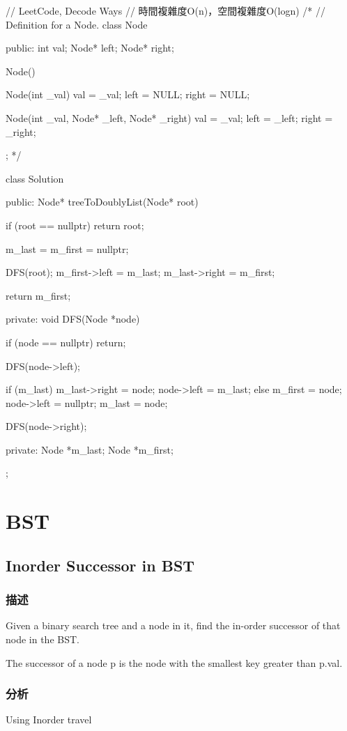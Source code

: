 \begin{Code}
// LeetCode, Decode Ways
// 時間複雜度O(n)，空間複雜度O(logn)
/*
// Definition for a Node.
class Node {
public:
    int val;
    Node* left;
    Node* right;

    Node() {}

    Node(int _val) {
        val = _val;
        left = NULL;
        right = NULL;
    }

    Node(int _val, Node* _left, Node* _right) {
        val = _val;
        left = _left;
        right = _right;
    }
};
*/

class Solution {
public:
    Node* treeToDoublyList(Node* root) {
        if (root == nullptr) return root;

        m_last = m_first = nullptr;

        DFS(root);
        m_first->left = m_last;
        m_last->right = m_first;

        return m_first;
    }
private:
    void DFS(Node *node)
    {
        if (node == nullptr) return;

        DFS(node->left);

        if (m_last)
        {
            m_last->right = node;
            node->left = m_last;
        }
        else
        {
            m_first = node;
            node->left = nullptr;
        }
        m_last = node;

        DFS(node->right);
    }
private:
    Node *m_last;
    Node *m_first;
};
\end{Code}

\section{BST}

\subsection{Inorder Successor in BST}
\label{sec:inorder-successor-in-bst}

\subsubsection{描述}
Given a binary search tree and a node in it, find the in-order successor of that node in the BST.

The successor of a node p is the node with the smallest key greater than p.val.

\subsubsection{分析}
Using Inorder travel


